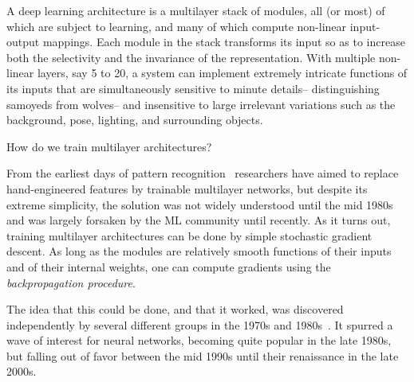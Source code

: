 \documentclass[10pts]{article}
\begin{document}

A deep learning architecture is a multilayer stack of modules, all (or
most) of which are subject to learning, and many of which compute
non-linear input-output mappings.  Each module in the stack transforms
its input so as to increase both the selectivity and the invariance of
the representation. With multiple non-linear layers, say 5 to 20, a system
can implement extremely intricate functions of its inputs that are
simultaneously sensitive to minute details-- distinguishing samoyeds
from wolves-- and insensitive to large irrelevant variations such as the
background, pose, lighting, and surrounding objects.

How do we train multilayer architectures? 

From the earliest days of pattern
recognition~\citep{selfridge,Rosenblatt57} researchers have aimed to
replace hand-engineered features by trainable multilayer networks,
but despite its extreme simplicity, the solution was not widely
understood until
the mid 1980s and was largely forsaken by the ML community until
recently. As it turns out, training multilayer architectures can be
done by simple stochastic gradient descent. As long as the modules are
relatively smooth functions of their inputs and of their internal
weights, one can compute gradients using the {\em backpropagation
  procedure}.

The idea that this could be done, and that it worked, was discovered independently by
several different groups in the 1970s and
1980s~\citep{Werbos74,Parker85,LeCun85,RHW}. It spurred a wave of interest for
neural networks, becoming quite popular in the late 1980s, but falling out of favor
between the mid 1990s until their renaissance in the late 2000s.
\end{document}
